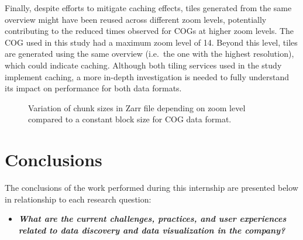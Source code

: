 \documentclass[
  oneside,
  open=any]{scrbook}
\providecommand{\tightlist}{%
  \setlength{\itemsep}{0pt}\setlength{\parskip}{0pt}}\usepackage{longtable,booktabs,array}
\begin{document}
Finally, despite efforts to mitigate caching effects, tiles generated
from the same overview might have been reused across different zoom
levels, potentially contributing to the reduced times observed for COGs
at higher zoom levels. The COG used in this study had a maximum zoom
level of 14. Beyond this level, tiles are generated using the same
overview (i.e.~the one with the highest resolution), which could
indicate caching. Although both tiling services used in the study
implement caching, a more in-depth investigation is needed to fully
understand its impact on performance for both data formats.

\begin{figure}[H]


\caption{\label{fig-chunksize-zarr}Variation of chunk sizes in Zarr file
depending on zoom level compared to a constant block size for COG data
format.}

\end{figure}%

\chapter{Conclusions}\label{conclusions}

The conclusions of the work performed during this internship are
presented below in relationship to each research question:

\begin{itemize}
\tightlist
\item
  \textbf{\emph{What are the current challenges, practices, and user
  experiences related to data discovery and data visualization in the
  company?}}
\end{itemize}
\end{document}
